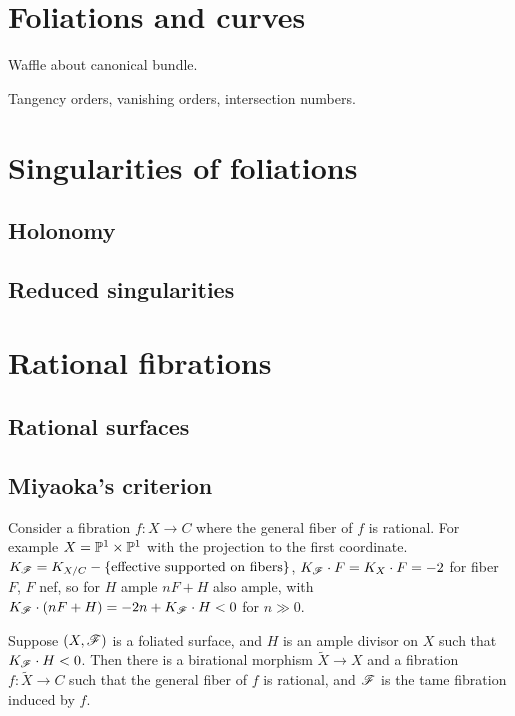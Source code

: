 \section{Foliations and curves} %

Waffle about canonical bundle.

Tangency orders, vanishing orders, intersection numbers.

\section{Singularities of foliations}

\subsection{Holonomy}


\subsection{Reduced singularities}



\section{Rational fibrations}


\subsection{Rational surfaces}

\subsection{Miyaoka's criterion}

Consider a fibration $f:X\to C$ where the general fiber of $f$ is rational. For
example $X=\P^1\times\P^1$ with the projection to the first coordinate.
$K_\scrF=K_{X/C}-\{\text{effective supported on fibers}\}$,
$K_\scrF\cdot F=K_X\cdot F=-2$ for fiber $F$, $F$ nef, so for $H$ ample $nF+H$
also ample, with $K_\scrF\cdot(nF+H)=-2n+K_\scrF\cdot H<0$ for $n\gg0$.

\begin{theorem}[Miyaoka]
    Suppose $(X,\scrF)$ is a foliated surface, and $H$ is an ample divisor on
    $X$ such that $K_\scrF\cdot H<0$. Then there is a birational morphism
    $\tilde X\to X$ and a fibration $f:\tilde X\to C$ such that the general
    fiber of $f$ is rational, and $\scrF$ is the tame fibration induced by $f$.
\end{theorem}


